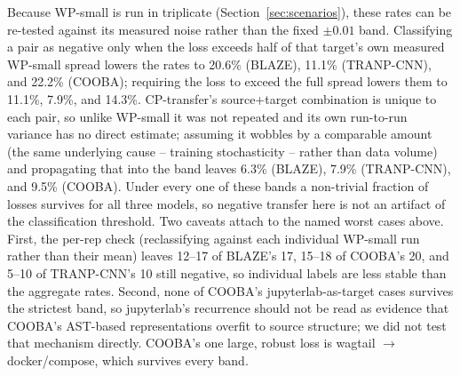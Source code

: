 \documentclass[a4paper,fleqn]{cas-dc}
\begin{document}
Because WP-small is run in triplicate (Section~\ref{sec:scenarios}), these
rates can be re-tested against its measured noise rather than the fixed
$\pm 0.01$ band. Classifying a pair as negative only when the loss exceeds
half of that target's own measured WP-small spread lowers the rates to
20.6\% (BLAZE), 11.1\% (TRANP-CNN), and 22.2\% (COOBA); requiring the loss to
exceed the full spread lowers them to 11.1\%, 7.9\%, and 14.3\%. CP-transfer's
source+target combination is unique to each pair, so unlike WP-small it was
not repeated and its own run-to-run variance has no direct estimate; assuming
it wobbles by a comparable amount (the same underlying cause -- training
stochasticity -- rather than data volume) and propagating that into the band
leaves 6.3\% (BLAZE), 7.9\% (TRANP-CNN), and 9.5\% (COOBA). Under every one of
these bands a non-trivial fraction of losses survives for all three models, so
negative transfer here is not an artifact of the classification threshold.
Two caveats attach to the named worst cases above. First, the
per-rep check (reclassifying against each individual WP-small run rather than
their mean) leaves 12--17 of BLAZE's 17, 15--18 of COOBA's 20, and 5--10 of
TRANP-CNN's 10 still negative, so individual labels are less stable than the
aggregate rates. Second, none of COOBA's jupyterlab-as-target cases survives
the strictest band, so jupyterlab's recurrence should not be read as evidence
that COOBA's AST-based representations overfit to source structure; we did not
test that mechanism directly. COOBA's one large, robust loss is wagtail $\to$
docker/compose, which survives every band.
\end{document}
